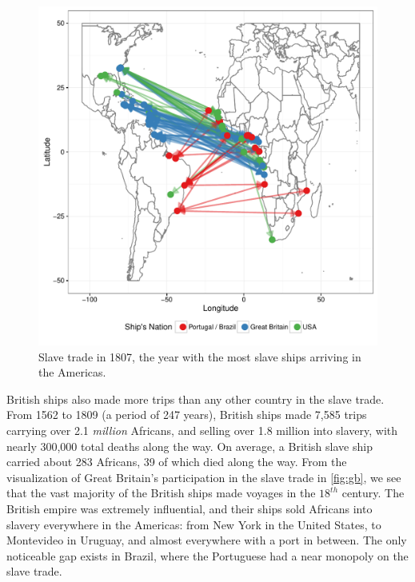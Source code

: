 \documentclass[DIV=calc, paper=a4, fontsize=10pt, twocolumn]{scrartcl}\usepackage[]{graphicx}\usepackage[]{color}
\makeatletter
\def\maxwidth{ %
  \ifdim\Gin@nat@width>\linewidth
    \linewidth
  \else
    \Gin@nat@width
  \fi
}
\newenvironment{knitrout}{}{} %
\makeatother
\begin{document}
\begin{knitrout}
\color{fgcolor}\begin{figure}[h]
\includegraphics[width=\maxwidth]{figure/biggest_year-1} \caption[Slave trade in 1807, the year with the most slave ships arriving in the Americas]{Slave trade in 1807, the year with the most slave ships arriving in the Americas.}\label{fig:biggest_year}
\end{figure}


\end{knitrout}

\par British ships also made more trips than any other country in the slave trade. From 1562 to 1809 (a period of 247 years), British ships made 7,585 trips carrying over 2.1 \emph{million} Africans, and selling over 1.8 million into slavery, with nearly 300,000 total deaths along the way. On average, a British slave ship carried about 283 Africans, 39 of which died along the way. From the visualization of Great Britain's participation in the slave trade in \autoref{fig:gb}, we see that the vast majority of the British ships made voyages in the $18^{th}$ century. The British empire was extremely influential, and their ships sold Africans into slavery everywhere in the Americas: from New York in the United States, to Montevideo in Uruguay, and almost everywhere with a port in between. The only noticeable gap exists in Brazil, where the Portuguese had a near monopoly on the slave trade.
\end{document}
